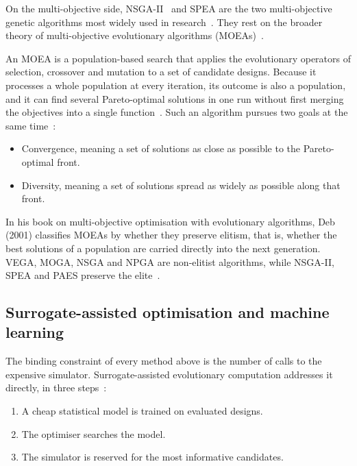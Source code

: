 On the multi-objective side, NSGA-II~\cite{deb_nsga2_2002} and SPEA are
the two multi-objective genetic algorithms most widely used in
research~\cite{stewart_2021}. They rest on the broader theory of
multi-objective evolutionary algorithms
(MOEAs)~\cite{deb_2001,coello_2007}.

An MOEA is a population-based search that applies the evolutionary
operators of selection, crossover and mutation to a set of candidate
designs. Because it processes a whole population at every iteration, its
outcome is also a population, and it can find several Pareto-optimal
solutions in one run without first merging the objectives into a single
function~\cite{deb_2001}. Such an algorithm pursues two goals at the same
time~\cite{deb_2001}:

\begin{itemize}
  \item Convergence, meaning a set of solutions as close as possible to
        the Pareto-optimal front.

  \item Diversity, meaning a set of solutions spread as widely as
        possible along that front.
\end{itemize}

In his book on multi-objective optimisation with evolutionary algorithms,
Deb (2001) classifies MOEAs by whether they preserve elitism, that is, whether
the best solutions of a population are carried directly into the next
generation. VEGA, MOGA, NSGA and NPGA are non-elitist algorithms, while
NSGA-II, SPEA and PAES preserve the elite~\cite{deb_2001}.

\subsection{Surrogate-assisted optimisation and machine learning}
\label{sec:lit-opt-surrogate}

The binding constraint of every method above is the number of calls to
the expensive simulator. Surrogate-assisted evolutionary computation
addresses it directly, in three steps~\cite{jin_2011}:

\begin{enumerate}
  \item A cheap statistical model is trained on evaluated designs.

  \item The optimiser searches the model.

  \item The simulator is reserved for the most informative candidates.
\end{enumerate}

